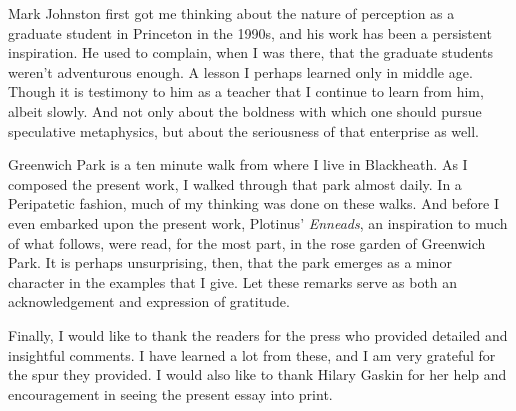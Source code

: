 Mark Johnston first got me thinking about the nature of perception as a graduate student in Princeton in the 1990s, and his work has been a persistent inspiration. He used to complain, when I was there, that the graduate students weren't adventurous enough. A lesson I perhaps learned only in middle age. Though it is testimony to him as a teacher that I continue to learn from him, albeit slowly. And not only about the boldness with which one should pursue speculative metaphysics, but about the seriousness of that enterprise as well.

Greenwich Park is a ten minute walk from where I live in Blackheath. As I composed the present work, I walked through that park almost daily. In a Peripatetic fashion, much of my thinking was done on these walks. And before I even embarked upon the present work, Plotinus' \emph{Enneads}, an inspiration to much of what follows, were read, for the most part, in the rose garden of Greenwich Park. It is perhaps unsurprising, then, that the park emerges as a minor character in the examples that I give. Let these remarks serve as both an acknowledgement and expression of gratitude.  

Finally, I would like to thank the readers for the press who provided detailed  and insightful comments. I have learned a lot from these, and I am very grateful for the spur they provided. I would also like to thank Hilary Gaskin for her help and encouragement in seeing the present essay into print.

